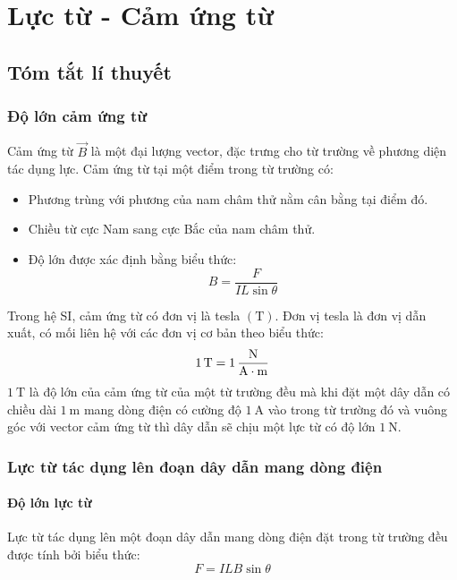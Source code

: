 \section{Lực từ - Cảm ứng từ}
\subsection{Tóm tắt lí thuyết}
\begin{tomtat}
	\subsubsection{Độ lớn cảm ứng từ}
	\begin{dn}
		Cảm ứng từ $\vec{B}$ là một đại lượng vector, đặc trưng cho từ trường về phương diện tác dụng lực. Cảm ứng từ tại một điểm trong từ trường có:
		\begin{itemize}
			\item Phương trùng với phương của nam châm thử nằm cân bằng tại điểm đó.
			\item Chiều từ cực  Nam sang cực Bắc của nam châm thử.
			\item Độ lớn được xác định bằng biểu thức:
			\begin{equation}
				B=\dfrac{F}{IL\sin\theta}
			\end{equation}
		\end{itemize}
	\end{dn}
	Trong hệ SI, cảm ứng từ có đơn vị là tesla $\left(\si{\tesla}\right)$. Đơn vị tesla là đơn vị dẫn xuất, có mối liên hệ với các đơn vị cơ bản theo biểu thức:
	\begin{equation}
		\SI{1}{\tesla}=\SI{1}{\dfrac{\newton}{\ampere\cdot\meter}}
	\end{equation}
	$\SI{1}{\tesla}$ là độ lớn của cảm ứng từ của một từ trường đều mà khi đặt một dây dẫn có chiều dài $\SI{1}{\meter}$ mang dòng điện có cường độ $\SI{1}{\ampere}$ vào trong từ trường đó và vuông góc với vector cảm ứng từ thì dây dẫn sẽ chịu một lực từ có độ lớn $\SI{1}{\newton}$.
	\subsubsection{Lực từ tác dụng lên đoạn dây dẫn mang dòng điện}
	\paragraph{Độ lớn lực từ}
	\begin{boxdl}
			Lực từ tác dụng lên một đoạn dây dẫn mang dòng điện đặt trong từ trường đều được tính bởi biểu thức:
		\begin{equation}
			F=ILB\sin\theta
		\end{equation}
	\end{boxdl}


\end{tomtat}
